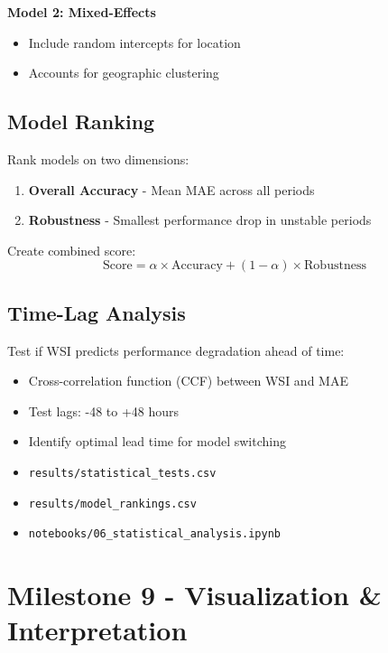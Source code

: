 \documentclass[11pt,a4paper]{article}
\begin{document}
\textbf{Model 2: Mixed-Effects}
\begin{itemize}
    \item Include random intercepts for location
    \item Accounts for geographic clustering
\end{itemize}

\subsection{Model Ranking}

Rank models on two dimensions:
\begin{enumerate}
    \item \textbf{Overall Accuracy} - Mean MAE across all periods
    \item \textbf{Robustness} - Smallest performance drop in unstable periods
\end{enumerate}

Create combined score:
\begin{equation}
\text{Score} = \alpha \times \text{Accuracy} + (1-\alpha) \times \text{Robustness}
\end{equation}

\subsection{Time-Lag Analysis}

Test if WSI predicts performance degradation ahead of time:
\begin{itemize}
    \item Cross-correlation function (CCF) between WSI and MAE
    \item Test lags: -48 to +48 hours
    \item Identify optimal lead time for model switching
\end{itemize}

\begin{deliverablebox}
\begin{itemize}
    \item \texttt{results/statistical\_tests.csv}
    \item \texttt{results/model\_rankings.csv}
    \item \texttt{notebooks/06\_statistical\_analysis.ipynb}
\end{itemize}
\end{deliverablebox}

\section{Milestone 9 - Visualization \& Interpretation}
\end{document}
